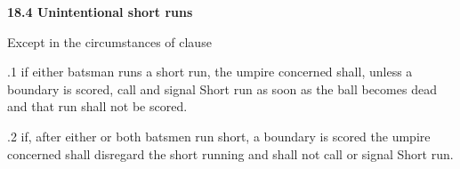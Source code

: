 \documentclass[12pt]{article}
\begin{document}
\vspace{\baselineskip}
{\fontsize{11pt}{13.2pt}\selectfont \textbf{18.4 \tabto{0.47in} Unintentional short runs}\par}\par


\vspace{\baselineskip}
{\fontsize{9pt}{10.8pt}\selectfont Except in the circumstances of clause \par}\par


\vspace{\baselineskip}
\begin{adjustwidth}{0.5in}{0.11in}
{\fontsize{9pt}{10.8pt}.1 \tabto{0.49in} if either batsman runs a short run, the umpire concerned shall, unless a boundary is scored, call and signal Short run as soon as the ball becomes dead and that run shall not be scored.\par}\par

\end{adjustwidth}


\vspace{\baselineskip}

\vspace{\baselineskip}

\vspace{\baselineskip}

\vspace{\baselineskip}

\vspace{\baselineskip}
\begin{Center}
{\fontsize{8pt}{9.6pt}\par}
\end{Center}\par


\vspace{\baselineskip}

\vspace{\baselineskip}
\begin{adjustwidth}{0.5in}{0.28in}
{\fontsize{9pt}{10.8pt}.2 \tabto{0.49in} if, after either or both batsmen run short, a boundary is scored the umpire concerned shall disregard the short running and shall not call or signal Short run.\par}\par

\end{adjustwidth}
\end{document}
